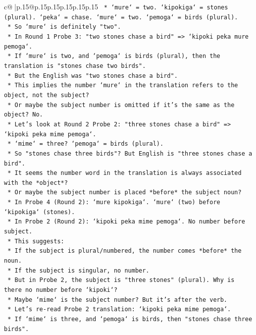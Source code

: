 \documentclass{article}
\begin{document}
{\begin{supertabular}{c@{$\;$}|p{.15\linewidth}@{}p{.15\linewidth}p{.15\linewidth}p{.15\linewidth}p{.15\linewidth}p{.15\linewidth}}
{{{\texttt{    *   `mure` = two. `kipokiga` = stones (plural). `peka` = chase. `mure` = two. `pemoga` = birds (plural).} \\
\texttt{    *   So `mure` is definitely "two".} \\
\texttt{    *   In Round 1 Probe 3: "two stones chase a bird" => `kipoki peka mure pemoga`.} \\
\texttt{    *   If `mure` is two, and `pemoga` is birds (plural), then the translation is "stones chase two birds".} \\
\texttt{    *   But the English was "two stones chase a bird".} \\
\texttt{    *   This implies the number `mure` in the translation refers to the object, not the subject?} \\
\texttt{    *   Or maybe the subject number is omitted if it's the same as the object? No.} \\
\texttt{    *   Let's look at Round 2 Probe 2: "three stones chase a bird" => `kipoki peka mime pemoga`.} \\
\texttt{    *   `mime` = three? `pemoga` = birds (plural).} \\
\texttt{    *   So "stones chase three birds"? But English is "three stones chase a bird".} \\
\texttt{    *   It seems the number word in the translation is always associated with the *object*?} \\
\texttt{    *   Or maybe the subject number is placed *before* the subject noun?} \\
\texttt{    *   In Probe 4 (Round 2): `mure kipokiga`. `mure` (two) before `kipokiga` (stones).} \\
\texttt{    *   In Probe 2 (Round 2): `kipoki peka mime pemoga`. No number before subject.} \\
\texttt{    *   This suggests:} \\
\texttt{        *   If the subject is plural/numbered, the number comes *before* the noun.} \\
\texttt{        *   If the subject is singular, no number.} \\
\texttt{        *   But in Probe 2, the subject is "three stones" (plural). Why is there no number before `kipoki`?} \\
\texttt{        *   Maybe `mime` is the subject number? But it's after the verb.} \\
\texttt{        *   Let's re{-}read Probe 2 translation: `kipoki peka mime pemoga`.} \\
\texttt{        *   If `mime` is three, and `pemoga` is birds, then "stones chase three birds".} \\
}}}
\end{supertabular}}
\end{document}
